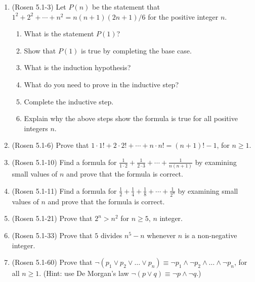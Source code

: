 \begin{enumerate}

\item (Rosen 5.1-3) Let $P(n)$ be the statement that
$1^{2} + 2^{2} + \cdots + n^{2} = n(n+1)(2n+1)/6$ for the positive integer $n$.

\begin{enumerate}
\item \streasy What is the statement $P(1)$?

\item \streasy Show that $P(1)$ is true by completing the base case.

\item \streasy What is the induction hypothesis?

\item \streasy What do you need to prove in the inductive step?

\item \strmedium Complete the inductive step.

\item \streasy Explain why the above steps show the formula is true for all positive integers $n$.
\end{enumerate}

\item \strmedium (Rosen 5.1-6) Prove that $1 \cdot 1! + 2 \cdot 2! + \cdots + n \cdot n! = (n+1)! -1$, 
for $n \geq 1$.

\item \strmedium (Rosen 5.1-10) Find a formula for 
$\frac{1}{1 \cdot 2} + \frac{1}{2 \cdot 3} + \cdots + \frac{1}{n (n+1)}$ 
by examining small values of $n$ and prove that the formula is correct.

\item \strmedium (Rosen 5.1-11) Find a formula for 
$\frac{1}{2} + \frac{1}{4} + \frac{1}{8} + \cdots + \frac{1}{2^{n}}$ 
by examining small values of $n$ and prove that the formula is correct.

\item \strmedium (Rosen 5.1-21) Prove that $2^n > n^2$ for $n \geq 5$, $n$ integer.

\item \strmedium (Rosen 5.1-33) Prove that $5$ divides
$n^{5}-n$ whenever $n$ is a non-negative integer.

\item \strmedium (Rosen 5.1-60) Prove that 
$\neg{(p_{1} \vee p_{2} \vee \ldots \vee p_{n})}
\equiv 
\neg{p_{1}} \wedge \neg{p_{2}} \wedge \ldots \wedge \neg{p_{n}}$,
for all $n \geq 1$.
(Hint: use De Morgan's law $\neg{(p \vee q)} \equiv \neg{p} \wedge \neg{q}$.)


\end{enumerate}
